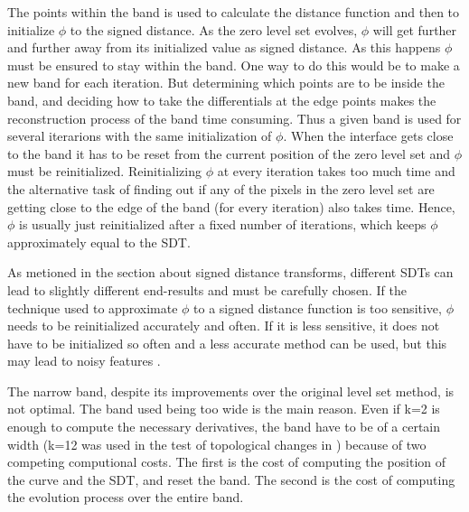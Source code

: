 The points within the band is used to calculate the distance function and then to initialize $\phi$ to the signed distance. As the zero level set evolves, \(\phi\) will get further and further away from its initialized value as signed distance. As this happens \(\phi\) must be ensured to stay within the band. One way to do this would be to make a new band for each iteration. But determining which points are to be inside the band, and deciding how to take the differentials at the edge points makes the reconstruction process of the band time consuming. Thus a given band is used for several iterarions with the same initialization of \(\phi\). When the interface gets close to the band it has to be reset from the current position of the zero level set and \(\phi\) must be reinitialized. Reinitializing \(\phi\) at every iteration takes too much time and the alternative task of finding out if any of the pixels in the zero level set are getting close to the edge of the band (for every iteration) also takes time. Hence, \(\phi\) is usually just reinitialized after a fixed number of iterations, which keeps \(\phi\) approximately equal to the SDT. 

As metioned in the section about signed distance transforms, different SDTs can lead to slightly different end-results and must be carefully chosen. If the technique used to approximate \(\phi\) to a signed distance function is too sensitive, \(\phi\) needs to be reinitialized accurately and often. If it is less sensitive, it does not have to be initialized so often and a less accurate method can be used, but this may lead to noisy features \cite{osher02}.

The narrow band, despite its improvements over the original level set method, is not optimal. The band used being too wide is the main reason. Even if k=2 is enough to compute the necessary derivatives, the band have to be of a certain width (k=12 was used in the test of topological changes in \cite{adalsteinsson94}) because of two competing computional costs\cite{whitaker89}. The first is the cost of computing the position of the curve and the SDT, and reset the band. The second is the cost of computing the evolution process over the entire band.
